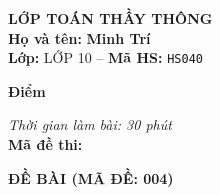 \noindent
\begin{tcolorbox}[colback=white,colframe=black,arc=0mm,boxrule=0.8pt,top=4pt,bottom=4pt,left=6pt,right=6pt]
	\begin{minipage}[c]{0.44\textwidth}
		{\bfseries\large LỚP TOÁN THẦY THÔNG}\\[3pt]
		\textbf{Họ và tên:} \textbf{\large Minh Trí}\\[3pt]
		\textbf{Lớp:} LỚP 10 \quad -- \quad \textbf{Mã HS:} \texttt{HS040}
	\end{minipage}
	\hfill
	\begin{minipage}[c]{0.22\textwidth}
		\begin{tcolorbox}[colback=white,colframe=black,arc=0mm,boxrule=0.6pt,height=1.8cm,halign=center,valign=top,top=2pt]
			{\bfseries\normalsize Điểm}
		\end{tcolorbox}
	\end{minipage}
	\hfill
	\begin{minipage}[c]{0.30\textwidth}
		\raggedleft
		\textit{Thời gian làm bài: 30 phút}\\[4pt]
		\textbf{Mã đề thi:} 
	\end{minipage}
\end{tcolorbox}
\vspace{0.25cm}

\noindent\textbf{\large ĐỀ BÀI (MÃ ĐỀ: 004)}
\vspace{0.1cm}

